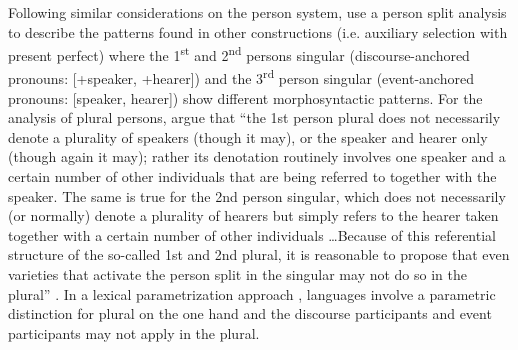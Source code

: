 \documentclass[output=paper]{langsci/langscibook}
\begin{document}
Following similar considerations on the person system, \citet{Manzini2007,Manzini2011Bio} use a person split analysis to describe the patterns found in other constructions (i.e. auxiliary selection with present perfect) where the 1\textsuperscript{st} and 2\textsuperscript{nd} persons singular (discourse-anchored pronouns: [+speaker, +hearer]) and the 3\textsuperscript{rd} person singular (event-anchored pronouns: [\textminus{}speaker, \textminus{}hearer]) show different morphosyntactic patterns. For the analysis of plural persons, \citet{Manzini2011Bio} argue that “the 1st person plural does not necessarily denote a plurality of speakers (though it may), or the speaker and hearer only (though again it may); rather its denotation routinely involves one speaker and a certain number of other individuals that are being referred to together with the speaker. The same is true for the 2nd person singular, which does not necessarily (or normally) denote a plurality of hearers but simply refers to the hearer taken together with a certain number of other individuals …Because of this referential structure of the so-called 1st and 2nd plural, it is reasonable to propose that even varieties that activate the person split in the singular may not do so in the plural” \citep[213]{Manzini2011Bio}. In a lexical parametrization approach \citep{Manzini1988,Manzini2011Bio}, languages involve a parametric distinction for plural on the one hand and the discourse participants and event participants may not apply in the plural. 
\end{document}
